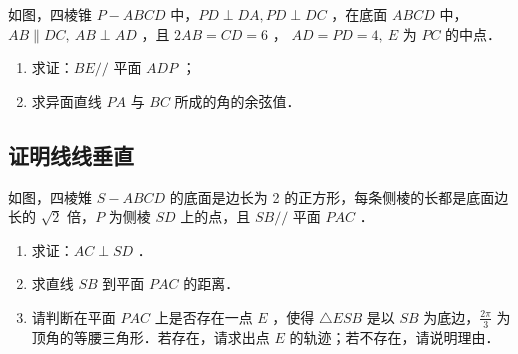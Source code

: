 \begin{figure} [H]
    \centering
    \resizebox{0.2\textwidth}{!}{}
\end{figure}

\begin{example}
    如图，四棱锥 $P-A B C D$ 中，$P D \perp D A, P D \perp D C$ ，在底面 $A B C D$ 中，$A B \| D C, ~ A B \perp A D$ ，且 $2 A B=C D=6$ ， $A D=P D=4, ~ E$ 为 $P C$ 的中点．
    \begin{enumerate}
        \item 求证：$B E / /$ 平面 $A D P$ ；
        \item 求异面直线 $P A$ 与 $B C$ 所成的角的余弦值．
    \end{enumerate}
\end{example}

\begin{figure} [H]
    \centering
    \resizebox{0.2\textwidth}{!}{}
\end{figure}

\subsection{证明线线垂直}

\begin{theorem}[线面垂直的性质]

\end{theorem}

\begin{example}
    如图，四棱雉 $S-A B C D$ 的底面是边长为 2 的正方形，每条侧棱的长都是底面边长的 $\sqrt{2}$ 倍，$P$ 为侧棱 $S D$ 上的点，且 $S B / /$ 平面 $P A C$ ．
    \begin{enumerate}
        \item 求证：$A C \perp S D$ ．

        \item 求直线 $S B$ 到平面 $P A C$ 的距离．

        \item 请判断在平面 $P A C$ 上是否存在一点 $E$ ，使得 $\triangle E S B$ 是以 $S B$ 为底边，$\frac{2 \pi}{3}$ 为顶角的等腰三角形．若存在，请求出点 $E$ 的轨迹；若不存在，请说明理由．
    \end{enumerate}
\end{example}

\begin{figure} [H]
    \centering
    \resizebox{0.2\textwidth}{!}{}
\end{figure}

